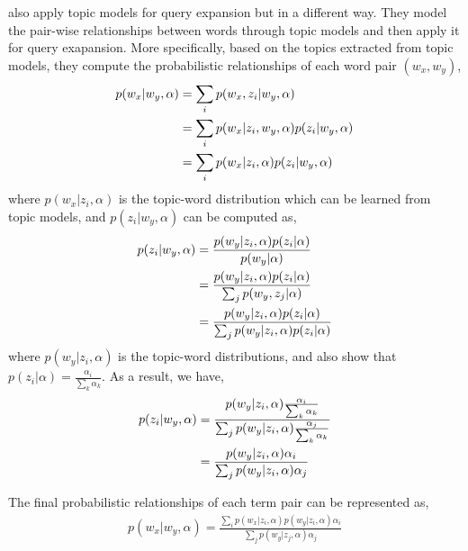 \cite{Park-2009} also apply topic models for query expansion but in a different way. They model the pair-wise relationships between words through topic models and then apply it for query exapansion. More specifically, based on the topics extracted from topic models, they compute the probabilistic relationships of each word pair $(w_x, w_y)$,
\begin{align}
p(w_x|w_y, \alpha) &= \sum_i p(w_x, z_i | w_y, \alpha) \\
&= \sum_i p(w_x | z_i, w_y, \alpha) p(z_i | w_y, \alpha) \notag\\
&= \sum_i p(w_x|z_i, \alpha) p(z_i|w_y, \alpha) \notag
\end{align}
where $p(w_x|z_i, \alpha)$ is the topic-word distribution which can be learned from topic models, and $p(z_i|w_y, \alpha)$ can be computed as,
\begin{align}
p(z_i|w_y, \alpha) &= \frac{p(w_y|z_i,\alpha)p(z_i|\alpha)}{p(w_y|\alpha)} \\
&= \frac{p(w_y|z_i,\alpha)p(z_i|\alpha)}{\sum_j p(w_y, z_j|\alpha)} \notag\\
&= \frac{p(w_y|z_i,\alpha)p(z_i|\alpha)}{\sum_j p(w_y|z_i,\alpha)p(z_i|\alpha)} \notag
\end{align}
where $p(w_y|z_i,\alpha)$ is the topic-word distributions, and \cite{Park-2009} also show that $p(z_i|\alpha) = \frac{\alpha_i}{\sum_k \alpha_k}$.
As a result, we have,
\begin{align}
p(z_i|w_y, \alpha) &= \frac{p(w_y|z_i,\alpha) \frac{\alpha_i}{\sum_k \alpha_k} }{\sum_j p(w_y|z_i,\alpha) \frac{\alpha_j}{\sum_k \alpha_k}} \\
&= \frac{p(w_y|z_i,\alpha) \alpha_i}{\sum_j p(w_y|z_i,\alpha) \alpha_j} \notag
\end{align}

The final probabilistic relationships of each term pair  can be represented as,
\begin{align}
p(w_x|w_y, \alpha) = \frac{\sum_i p(w_x|z_i, \alpha) p(w_y|z_i,\alpha) \alpha_i }{\sum_j p(w_y|z_j,\alpha) \alpha_j}
\end{align}

